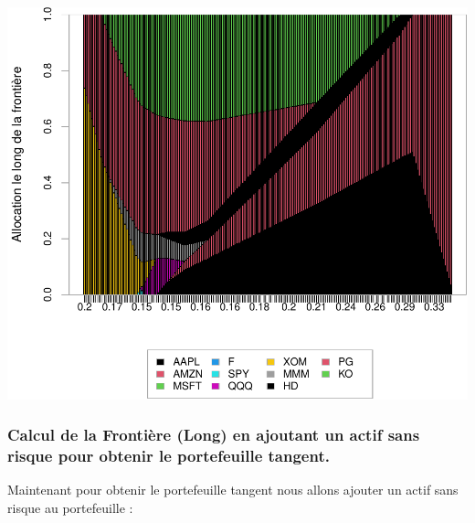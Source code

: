 \documentclass[
]{article}
\begin{document}
\includegraphics{TP-2_files/figure-latex/unnamed-chunk-6-1.pdf}

\hypertarget{calcul-de-la-frontiuxe8re-long-en-ajoutant-un-actif-sans-risque-pour-obtenir-le-portefeuille-tangent.}{%
\subsubsection{Calcul de la Frontière (Long) en ajoutant un actif sans
risque pour obtenir le portefeuille
tangent.}\label{calcul-de-la-frontiuxe8re-long-en-ajoutant-un-actif-sans-risque-pour-obtenir-le-portefeuille-tangent.}}

Maintenant pour obtenir le portefeuille tangent nous allons ajouter un
actif sans risque au portefeuille :
\end{document}
